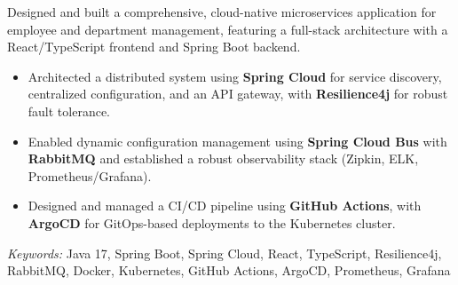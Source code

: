 \nointent
{}


\nointent
Designed and built a comprehensive, cloud-native microservices application for employee and department management, featuring a full-stack architecture with a React/TypeScript frontend and Spring Boot backend.

\begin{itemize}
    \item Architected a distributed system using \textbf{Spring Cloud} for service discovery, centralized configuration, and an API gateway, with \textbf{Resilience4j} for robust fault tolerance.
    \item Enabled dynamic configuration management using \textbf{Spring Cloud Bus} with \textbf{RabbitMQ} and established a robust observability stack (Zipkin, ELK, Prometheus/Grafana).
    \item Designed and managed a CI/CD pipeline using \textbf{GitHub Actions}, with \textbf{ArgoCD} for GitOps-based deployments to the Kubernetes cluster.
\end{itemize}

\nointent
\textit{Keywords:} Java 17, Spring Boot, Spring Cloud, React, TypeScript, Resilience4j, RabbitMQ, Docker, Kubernetes, GitHub Actions, ArgoCD, Prometheus, Grafana
